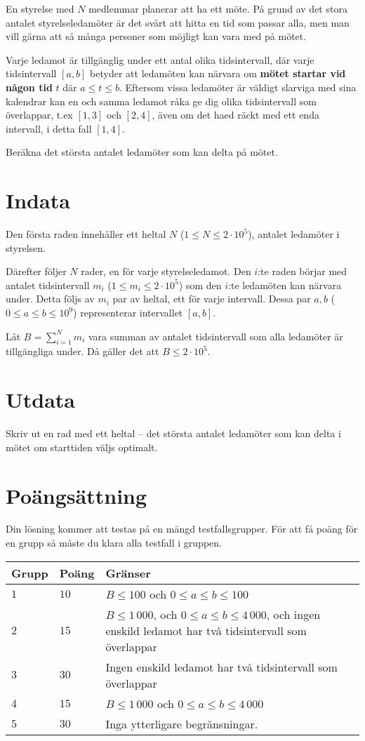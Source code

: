 En styrelse med $N$ medlemmar planerar att ha ett möte.
På grund av det stora antalet styrelseledamöter är det svårt att hitta en tid som passar alla, men man vill gärna att så många personer som möjligt kan vara med på mötet.

Varje ledamot är tillgänglig under ett antal olika tidsintervall, där varje tidsintervall $[a, b]$ betyder att ledamöten kan närvara om \textbf{mötet startar vid någon tid} $t$ där $a \le t \le b$.
Eftersom vissa ledamöter är väldigt slarviga med sina kalendrar kan en och samma ledamot råka ge dig olika tidsintervall som överlappar, t.ex $[1, 3]$ och $[2, 4]$, även om det haed räckt med ett enda intervall, i detta fall $[1, 4]$.

Beräkna det största antalet ledamöter som kan delta på mötet.

\section*{Indata}
Den första raden innehåller ett heltal $N$ ($1 \le N \leq 2\cdot 10^5$), antalet ledamöter i styrelsen.

Därefter följer $N$ rader, en för varje styrelseledamot.
Den $i$:te raden börjar med antalet tidsintervall $m_i$ ($1 \leq m_i \leq 2\cdot 10^5$) som den $i$:te ledamöten kan närvara under.
Detta följs av $m_i$ par av heltal, ett för varje intervall.
Dessa par $a, b$ ($0 \le a \le b \le 10^9$) representerar intervallet $[a, b]$.

Låt $B=\sum_{i=1}^{N} m_i$ vara summan av antalet tidsintervall som alla ledamöter är tillgängliga under.
Då gäller det att $B \leq 2\cdot 10^5$.

\section*{Utdata}
Skriv ut en rad med ett heltal -- det största antalet ledamöter som kan delta i mötet om starttiden väljs optimalt.

\section*{Poängsättning}
Din lösning kommer att testas på en mängd testfallsgrupper.
För att få poäng för en grupp så måste du klara alla testfall i gruppen.

\noindent
\begin{tabular}{| l | l | p{12cm} |}
  \hline
  \textbf{Grupp} & \textbf{Poäng} & \textbf{Gränser} \\ \hline
  $1$   & $10$       & $B \leq 100$ och $0 \leq a \leq b \leq 100$ \\ \hline
  $2$   & $15$       & $B \leq  1\,000$, och $0 \leq a \leq b \leq 4\,000$, och ingen enskild ledamot har två tidsintervall som överlappar \\ \hline
  $3$   & $30$       & Ingen enskild ledamot har två tidsintervall som överlappar \\ \hline
  $4$   & $15$       & $B \leq 1\,000$ och $0 \leq a \leq b \leq 4\,000$ \\ \hline
  $5$   & $30$       & Inga ytterligare begränsningar. \\ \hline
\end{tabular}

